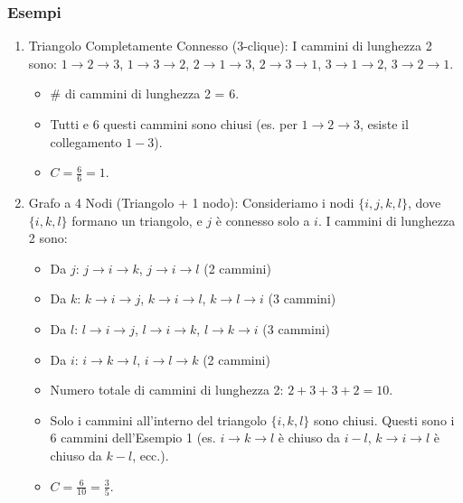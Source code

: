 \subsubsection{Esempi}
\begin{enumerate}
\item Triangolo Completamente Connesso (3-clique):
I cammini di lunghezza 2 sono: $1\to2\to3$, $1\to3\to2$, $2\to1\to3$, $2\to3\to1$, $3\to1\to2$, $3\to2\to1$.
\begin{itemize}
\item \# di cammini di lunghezza 2 = 6.
\item Tutti e 6 questi cammini sono chiusi (es. per $1\to2\to3$, esiste il collegamento $1-3$).
\item $C = \frac{6}{6} = 1$.
\end{itemize}

\item Grafo a 4 Nodi (Triangolo + 1 nodo):
Consideriamo i nodi $\{i, j, k, l\}$, dove $\{i, k, l\}$ formano un triangolo, e $j$ è connesso solo a $i$.
I cammini di lunghezza 2 sono:
\begin{itemize}
\item Da $j$: $j \to i \to k$, $j \to i \to l$ (2 cammini)
\item Da $k$: $k \to i \to j$, $k \to i \to l$, $k \to l \to i$ (3 cammini)
\item Da $l$: $l \to i \to j$, $l \to i \to k$, $l \to k \to i$ (3 cammini)
\item Da $i$: $i \to k \to l$, $i \to l \to k$ (2 cammini)
\end{itemize}
\begin{itemize}
\item Numero totale di cammini di lunghezza 2: $2+3+3+2 = 10$.
\item Solo i cammini all'interno del triangolo $\{i, k, l\}$ sono chiusi. Questi sono i 6 cammini dell'Esempio 1 (es. $i \to k \to l$ è chiuso da $i-l$, $k \to i \to l$ è chiuso da $k-l$, ecc.).
\item $C = \frac{6}{10} = \frac{3}{5}$.
\end{itemize}
\end{enumerate}

